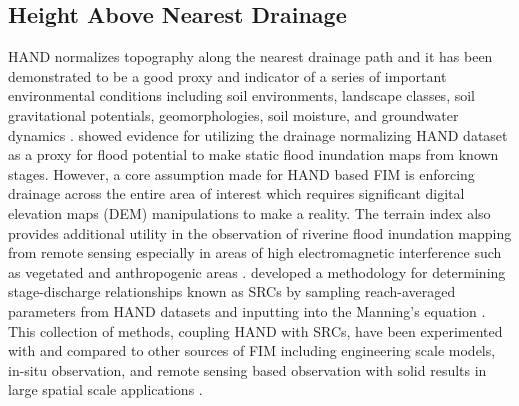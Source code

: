 \documentclass[draft]{dependencies/agujournal2019}
\begin{document}
\subsection{Height Above Nearest Drainage}
%
HAND normalizes topography along the nearest drainage path and it has been demonstrated to be a good proxy and indicator of a series of important environmental conditions including soil environments, landscape classes, soil gravitational potentials, geomorphologies, soil moisture, and groundwater dynamics \cite{renno2008hand,nobre2011height}. 
 showed evidence for utilizing the drainage normalizing HAND dataset as a proxy for flood potential to make static flood inundation maps from known stages.
However, a core assumption made for HAND based FIM is enforcing drainage across the entire area of interest which requires significant digital elevation maps (DEM) manipulations to make a reality.
The terrain index also provides additional utility in the observation of riverine flood inundation mapping from remote sensing especially in areas of high electromagnetic interference such as vegetated and anthropogenic areas \cite{aristizabal2020high,shastry2019using,huang2017comparison,twele2016sentinel}.
 developed a methodology for determining stage-discharge relationships known as SRCs by sampling reach-averaged parameters from HAND datasets and inputting into the Manning's equation \cite{gauckler1867etudes,manning1890flow}.
This collection of methods, coupling HAND with SRCs, have been experimented with and compared to other sources of FIM including engineering scale models, in-situ observation, and remote sensing based observation with solid results in large spatial scale applications \cite{godbout2019error,johnson2019integrated,garousi2019terrain,nobre2016hand,afshari2018comparison,zheng2018geoflood,teng2015rapid,teng2017flood,zhang2018comparative}.
%
\end{document}
